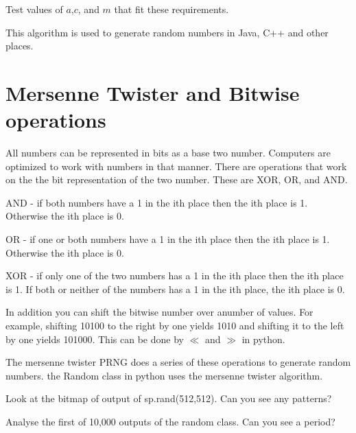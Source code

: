 \begin{problem}
Test values of $a$,$c$, and $m$ that fit these requirements. 
\end{problem}

This algorithm is used to generate random numbers in Java, C++ and other places.

\section*{Mersenne Twister and Bitwise operations}


All numbers can be represented in bits as a base two number. Computers are optimized to work with numbers in that manner. There are operations that work on the the bit representation of the two number. These are XOR, OR, and AND. 

AND - if both numbers have a 1 in the ith place then the ith place is 1. Otherwise the ith place is 0.

OR - if one or both numbers have a 1 in the ith place then the ith place is 1. Otherwise the ith place is 0.

XOR - if only one of the two numbers has a 1 in the ith place then the ith place is 1. If both or neither of the numbers has a 1 in the ith place, the ith place is 0.

In addition you can shift the bitwise number over anumber of values. For example, shifting 10100 to the right by one yields 1010 and shifting it to the left by one yields 101000. This can be done by $\ll$ and $\gg$ in python. 


The mersenne twister PRNG does a series of these operations to generate random numbers. the Random class in python uses the mersenne twister algorithm. 

\begin{problem}
Look at the bitmap of output of sp.rand(512,512). Can you see any patterns?
\end{problem}

\begin{problem}
Analyse the first of 10,000 outputs of the random class. Can you see a period?
\end{problem}
